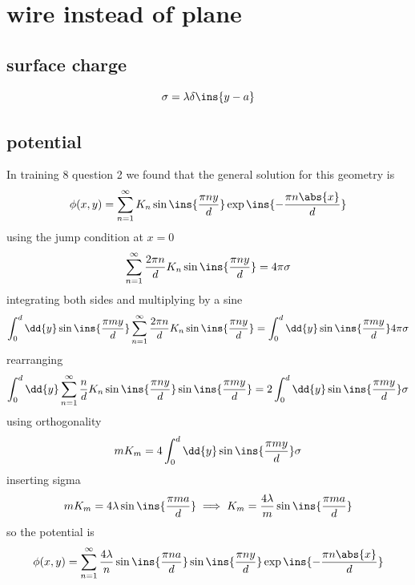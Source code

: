 \clearpage
\section{wire instead of plane}
\subsection{surface charge}
\begin{equation}
	\sigma = \lambda\delta\ins{y-a}
\end{equation}
\subsection{potential}
In training 8 question 2 we found that the general solution for this geometry is 
\begin{equation}
	\phi(x,y)=\sum_{n=1}^{\infty}K_n\sin\ins{\frac{\pi ny}{d}}\exp\ins{-\frac{\pi n\abs{x}}{d}}
\end{equation}
using the jump condition at \(x=0\)
\begin{equation}
	\sum_{n=1}^{\infty}\frac{2\pi n}{d}K_n\sin\ins{\frac{\pi ny}{d}}=4\pi\sigma
\end{equation}
integrating both sides and multiplying by a sine 
\begin{equation}
	\int_{0}^{d}\dd{y}\sin\ins{\frac{\pi my}{d}}\sum_{n=1}^{\infty}\frac{2\pi n}{d}K_n\sin\ins{\frac{\pi ny}{d}}=\int_{0}^{d}\dd{y}\sin\ins{\frac{\pi my}{d}}4\pi\sigma
\end{equation}
rearranging 
\begin{equation}
	\int_{0}^{d}\dd{y}\sum_{n=1}^{\infty}\frac{n}{d}K_n\sin\ins{\frac{\pi ny}{d}}\sin\ins{\frac{\pi my}{d}}=2\int_{0}^{d}\dd{y}\sin\ins{\frac{\pi my}{d}}\sigma
\end{equation}
using orthogonality
\begin{equation}
	mK_m=4\int_{0}^{d}\dd{y}\sin\ins{\frac{\pi my}{d}}\sigma
\end{equation}
inserting sigma 
\begin{equation}
	mK_m=4\lambda\sin\ins{\frac{\pi ma}{d}} \implies K_m=\frac{4\lambda}{m}\sin\ins{\frac{\pi ma}{d}}
\end{equation}
so the potential is 
\begin{equation}
	\phi(x,y)=\sum_{n=1}^{\infty}\frac{4\lambda}{n}\sin\ins{\frac{\pi na}{d}}\sin\ins{\frac{\pi ny}{d}}\exp\ins{-\frac{\pi n\abs{x}}{d}}
\end{equation}
